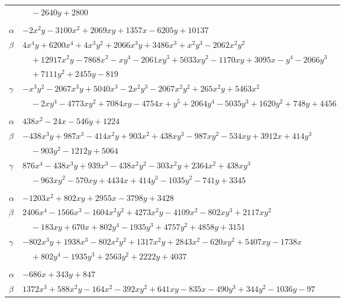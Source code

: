 \documentclass[11pt]{article}
\begin{document}
\begin{longtable}{@{}ll@{}}
 & $\quad -2640y+2800$\\
\addlinespace[3pt]
\multicolumn{2}{@{}l}{$\{i,j\}=\{12,135\}$, $k_{ij}=2^{8}\cdot 7\cdot 19$}\\
$\alpha$ & $-2x^{2}y-3100x^{2}+2069xy+1357x-6205y+10137$\\
$\beta$ & $4x^{4}y+6200x^{4}+4x^{3}y^{2}+2066x^{3}y+3486x^{3}+x^{2}y^{3}-2062x^{2}y^{2}$\\
 & $\quad +12917x^{2}y-7868x^{2}-xy^{4}-2061xy^{3}+5033xy^{2}-1170xy+3095x-y^{4}-2066y^{3}$\\
 & $\quad +7111y^{2}+2455y-819$\\
$\gamma$ & $-x^{3}y^{2}-2067x^{3}y+5040x^{3}-2x^{2}y^{3}-2067x^{2}y^{2}+265x^{2}y+5463x^{2}$\\
 & $\quad -2xy^{4}-4773xy^{2}+7084xy-4754x+y^{5}+2064y^{4}-5035y^{3}+1620y^{2}+748y+4456$\\
\addlinespace[3pt]
\multicolumn{2}{@{}l}{$\{i,j\}=\{12,136\}$, $k_{ij}=2^{5}\cdot 3\cdot 7\cdot 13$}\\
$\alpha$ & $438x^{2}-24x-546y+1224$\\
$\beta$ & $-438x^{3}y+987x^{3}-414x^{2}y+903x^{2}+438xy^{3}-987xy^{2}-534xy+3912x+414y^{3}$\\
 & $\quad -903y^{2}-1212y+5064$\\
$\gamma$ & $876x^{4}-438x^{3}y+939x^{3}-438x^{2}y^{2}-303x^{2}y+2364x^{2}+438xy^{3}$\\
 & $\quad -963xy^{2}-570xy+4434x+414y^{3}-1035y^{2}-741y+3345$\\
\addlinespace[3pt]
\multicolumn{2}{@{}l}{$\{i,j\}=\{12,137\}$, $k_{ij}=2^{6}\cdot 3\cdot 7\cdot 13$}\\
$\alpha$ & $-1203x^{2}+802xy+2955x-3798y+3428$\\
$\beta$ & $2406x^{4}-1566x^{3}-1604x^{2}y^{2}+4273x^{2}y-4109x^{2}-802xy^{3}+2117xy^{2}$\\
 & $\quad -183xy+670x+802y^{4}-1935y^{3}+4757y^{2}+4858y+3151$\\
$\gamma$ & $-802x^{3}y+1938x^{3}-802x^{2}y^{2}+1317x^{2}y+2843x^{2}-620xy^{2}+5407xy-1738x$\\
 & $\quad +802y^{4}-1935y^{3}+2563y^{2}+2222y+4037$\\
\addlinespace[3pt]
\multicolumn{2}{@{}l}{$\{i,j\}=\{12,200\}$, $k_{ij}=2^{6}\cdot 3^{2}\cdot 7$}\\
$\alpha$ & $-686x+343y+847$\\
$\beta$ & $1372x^{3}+588x^{2}y-164x^{2}-392xy^{2}+641xy-835x-490y^{3}+344y^{2}-1036y-97$\\

\end{longtable}
\end{document}
